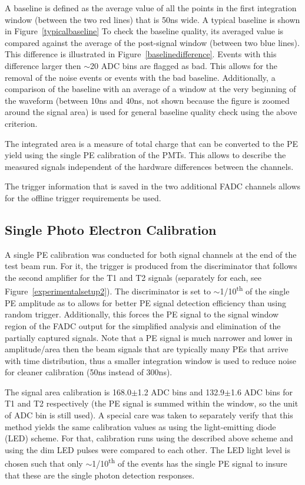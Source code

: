 \documentclass[preprint,12pt]{elsarticle}
\begin{document}
A baseline is defined as the average value of all the points in the first integration window (between the two red lines) that is 50ns wide. A typical baseline is shown in Figure~\ref{typicalbaseline} To check the baseline quality, its averaged value is compared against the average of the post-signal window (between two blue lines). This difference is illustrated in Figure~\ref{baselinedifference}. Events with this difference larger then $\sim$20 ADC bins are flagged as bad. This allows for the removal of the noise events or events with the bad baseline. Additionally, a comparison of the baseline with an average of a window at the very beginning of the waveform (between 10ns and 40ns, not shown because the figure is zoomed around the signal area) is used for general baseline quality check using the above criterion.


The integrated area is a measure of total charge that can be converted to the PE yield using the single PE calibration of the PMTs. This allows to describe the measured signals independent of the hardware differences between the channels.

The trigger information that is saved in the two additional FADC channels allows for the offline trigger requirements be used.

\subsection{Single Photo Electron Calibration}
\label{singlePEcalibsection}

A single PE calibration was conducted for both signal channels at the end of the test beam run. For it, the trigger is produced from the discriminator that follows the second amplifier for the T1 and T2 signals (separately for each, see Figure~\ref{experimentalsetup2}). The discriminator is set to $\sim$1/10\textsuperscript{th} of the single PE amplitude as to	allows for better PE signal detection efficiency than using random trigger. Additionally, this forces the PE signal to the signal window region of the FADC output for the simplified analysis and elimination of the partially captured signals. Note that a PE signal is much narrower and lower in amplitude/area then the beam signals that are typically many PEs that arrive with time distribution, thus a smaller integration window is used to reduce noise for cleaner calibration (50ns instead of 300ns).

The signal area calibration is 168.0$\pm$1.2 ADC bins and 132.9$\pm$1.6 ADC bins for T1 and T2 respectively (the PE signal is summed within the window, so the unit of ADC bin is still used). A special care was taken to separately verify that this method yields the same calibration values as using the light-emitting diode (LED) scheme. For that, calibration runs using the described above scheme and using the dim LED pulses were compared to each other. The LED light level is chosen such that only $\sim$1/10\textsuperscript{th} of the events has the single PE signal to insure that these are the single photon detection responses.
\end{document}
